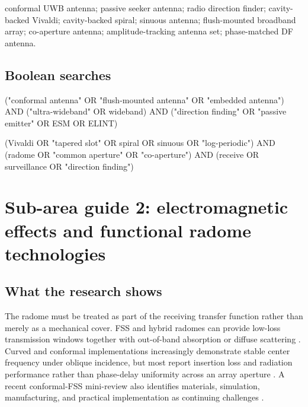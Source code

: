 \documentclass[
  10pt,
]{article}
\newenvironment{Shaded}{}{}
\newcommand{\NormalTok}[1]{#1}
\begin{document}
conformal UWB antenna; passive seeker antenna; radio direction finder;
cavity-backed Vivaldi; cavity-backed spiral; sinuous antenna;
flush-mounted broadband array; co-aperture antenna; amplitude-tracking
antenna set; phase-matched DF antenna.

\subsection{Boolean searches}\label{boolean-searches}

\begin{Shaded}
\begin{Highlighting}[]
\NormalTok{("conformal antenna" OR "flush{-}mounted antenna" OR "embedded antenna")}
\NormalTok{AND ("ultra{-}wideband" OR wideband)}
\NormalTok{AND ("direction finding" OR "passive emitter" OR ESM OR ELINT)}
\end{Highlighting}
\end{Shaded}

\begin{Shaded}
\begin{Highlighting}[]
\NormalTok{(Vivaldi OR "tapered slot" OR spiral OR sinuous OR "log{-}periodic")}
\NormalTok{AND (radome OR "common aperture" OR "co{-}aperture")}
\NormalTok{AND (receive OR surveillance OR "direction finding")}
\end{Highlighting}
\end{Shaded}

\section{Sub-area guide 2: electromagnetic effects and functional radome
technologies}\label{sub-area-guide-2-electromagnetic-effects-and-functional-radome-technologies}

\subsection{What the research shows}\label{what-the-research-shows-1}

The radome must be treated as part of the receiving transfer function
rather than merely as a mechanical cover. FSS and hybrid radomes can
provide low-loss transmission windows together with out-of-band
absorption or diffuse scattering \citep{costa2012, lv2021, xing2022}.
Curved and conformal implementations increasingly demonstrate stable
center frequency under oblique incidence, but most report insertion loss
and radiation performance rather than phase-delay uniformity across an
array aperture \citep{omar2018, sheng2024}. A recent conformal-FSS
mini-review also identifies materials, simulation, manufacturing, and
practical implementation as continuing challenges \citep{korkut2024}.
\end{document}
